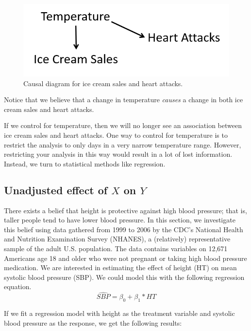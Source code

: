 \documentclass[]{book}
\begin{document}
\begin{figure}
\centering
\includegraphics{./images/ice_cream_graph.png}
\caption{Causal diagram for ice cream sales and heart attacks.}
\end{figure}

Notice that we believe that a change in temperature \emph{causes} a change in both ice cream sales and heart attacks.

If we control for temperature, then we will no longer see an association between ice cream sales and heart attacks. One way to control for temperature is to restrict the analysis to only days in a very narrow temperature range. However, restricting your analysis in this way would result in a lot of lost information. Instead, we turn to statistical methods like regression.

\hypertarget{unadjusted-effect-of-x-on-y}{%
\subsection{\texorpdfstring{Unadjusted effect of \(X\) on \(Y\)}{Unadjusted effect of X on Y}}\label{unadjusted-effect-of-x-on-y}}

There exists a belief that height is protective against high blood pressure; that is, taller people tend to have lower blood pressure. In this section, we investigate this belief using data gathered from 1999 to 2006 by the CDC's National Health and Nutrition Examination Survey (NHANES), a (relatively) representative sample of the adult U.S. population. The data contains variables on 12,671 Americans age 18 and older who were not pregnant or taking high blood pressure medication. We are interested in estimating the effect of height (HT) on mean systolic blood pressure (SBP). We could model this with the following regression equation.
\[\widehat{SBP}=\beta_0+\beta_1*HT\]

If we fit a regression model with height as the treatment variable and systolic blood pressure as the response, we get the following results:
\end{document}
